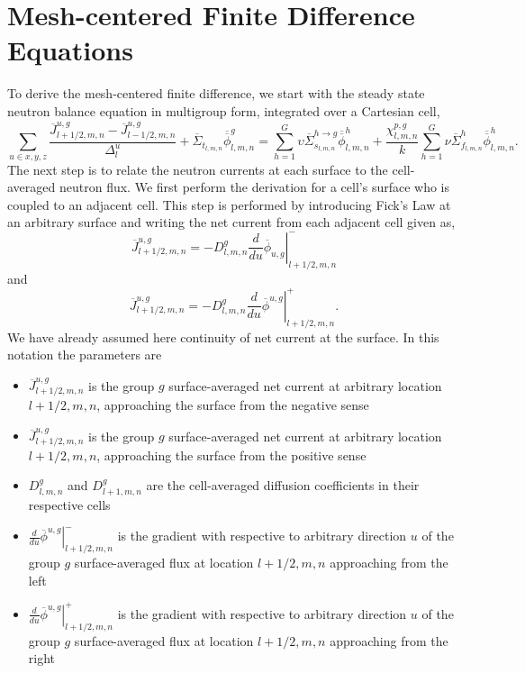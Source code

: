 \documentclass{ansconf}
\numberwithin{equation}{section}
\begin{document}
\section{Mesh-centered Finite Difference Equations} \label{app:fdm}
To derive the mesh-centered finite difference, we start with the steady state neutron balance equation in multigroup form, integrated over a Cartesian cell,
\begin{equation}\label{eq:FD_NBE}
\sum_{u \in x,y,z} \frac{\overline{J}^{u,g}_{l+1/2,m,n} - \overline{J}^{u,g}_{l-1/2,m,n}}{\Delta_l^u} + \overline\Sigma_{t_{l,m,n}}\overline{\overline{\phi}}_{l,m,n}^g  = \sum_{h=1}^G\upsilon\overline\Sigma^{h\rightarrow g}_{s_{l,m,n}}\overline{\overline{\phi}}_{l,m,n}^h + \frac{\chi_{l,m,n}^{p,g}}{k}\sum_{h=1}^G\nu\overline\Sigma^{h}_{f_{l,m,n}}  \overline{\overline{\phi}}_{l,m,n}^h.
\end{equation}
The next step is to relate the neutron currents at each surface to the cell-averaged neutron flux. We first perform the derivation for a cell's surface who is coupled to an adjacent cell. This step is performed by introducing Fick's Law at an arbitrary surface and writing the net current from each adjacent cell given as,
\begin{equation}
  \overline{J}^{u,g}_{l+1/2,m,n}=-D_{l,m,n}^{g}\left.\frac{d}{du}\overline{\phi}_{u,g}\right|_{l+1/2,m,n}^{-}
\end{equation}
and
\begin{equation}
  \overline{J}^{u,g}_{l+1/2,m,n}=-D_{l,m,n}^{g}\left.\frac{d}{du}\overline{\phi}^{u,g}\right|_{l+1/2,m,n}^{+}.
\end{equation}
We have already assumed here continuity of net current at the surface. In this notation the parameters are
\begin{itemize}
\item $\overline{J}^{u,g}_{l+1/2,m,n}$ is the group
$g$ surface-averaged net current at arbitrary location $l+1/2,m,n$,
approaching the surface from the negative sense
\item $\overline{J}^{u,g}_{l+1/2,m,n}$ is the group
$g$ surface-averaged net current at arbitrary location $l+1/2,m,n$,
approaching the surface from the positive sense
\item $D_{l,m,n}^{g}$ and $D_{l+1,m,n}^{g}$ are the cell-averaged diffusion
coefficients in their respective cells
\item $\left.\frac{d}{du}\overline{\phi}^{u,g}\right|_{l+1/2,m,n}^{-}$
is the gradient with respective to arbitrary direction $u$ of the
group $g$ surface-averaged flux at location $l+1/2,m,n$ approaching
from the left
\item $\left.\frac{d}{du}\overline{\phi}^{u,g}\right|_{l+1/2,m,n}^{+}$
is the gradient with respective to arbitrary direction $u$ of the
group $g$ surface-averaged flux at location $l+1/2,m,n$ approaching
from the right
\end{itemize}
\end{document}
